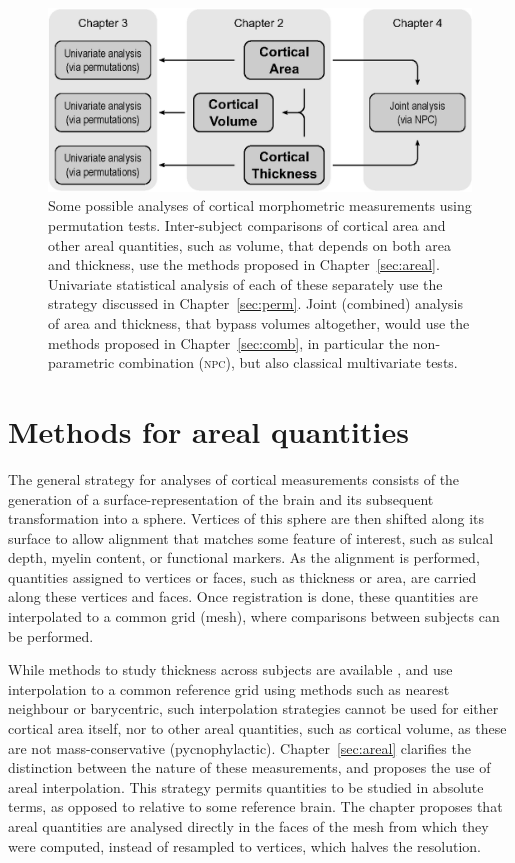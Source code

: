 \begin{figure}[tbp]
\begin{center}
\centerline{\includegraphics{images/flow.eps}}
\end{center}
\caption[Some possible analyses of cortical morphometric measurements using permutation tests.]{Some possible analyses of cortical morphometric measurements using permutation tests. Inter-subject comparisons of cortical area and other areal quantities, such as volume, that depends on both area and thickness, use the methods proposed in Chapter~\ref{sec:areal}. Univariate statistical analysis of each of these separately use the strategy discussed in Chapter~\ref{sec:perm}. Joint (combined) analysis of area and thickness, that bypass volumes altogether, would use the methods proposed in Chapter~\ref{sec:comb}, in particular the non-parametric combination (\textsc{npc}), but also classical multivariate tests.}
\label{fig:intro:flow}
\end{figure}

\section{Methods for areal quantities}

The general strategy for analyses of cortical measurements consists of the generation of a surface-representation of the brain and its subsequent transformation into a sphere. Vertices of this sphere are then shifted along its surface to allow alignment that matches some feature of interest, such as sulcal depth, myelin content, or functional markers. As the alignment is performed, quantities assigned to vertices or faces, such as thickness or area, are carried along these vertices and faces. Once registration is done, these quantities are interpolated to a common grid (mesh), where comparisons between subjects can be performed.  

While methods to study thickness across subjects are available \citep{Fischl2000}, and use interpolation to a common reference grid using methods such as nearest neighbour or barycentric, such interpolation strategies cannot be used for either cortical area itself, nor to other areal quantities, such as cortical volume, as these are not mass-conservative (pycnophylactic). Chapter~\ref{sec:areal} clarifies the distinction between the nature of these measurements, and proposes the use of areal interpolation. This strategy permits quantities to be studied in absolute terms, as opposed to relative to some reference brain. The chapter proposes that areal quantities are analysed directly in the faces of the mesh from which they were computed, instead of resampled to vertices, which halves the resolution.

